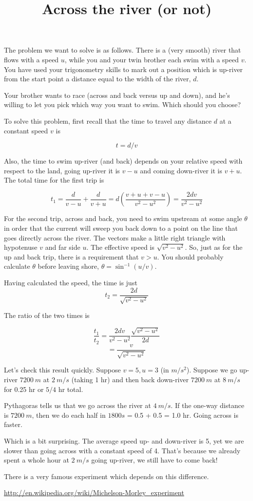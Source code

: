 \documentclass[11pt, oneside]{article}
\title{Across the river (or not)}
\date{}
\begin{document}
\maketitle
\Large


The problem we want to solve is as follows.  There is a (very smooth) river that flows with a speed $u$, while you and your twin brother each swim with a speed $v$.  You have used your trigonometry skills to mark out a position which is up-river from the start point a distance equal to the width of the river, $d$.

Your brother wants to race (across and back versus up and down), and he's willing to let you pick which way you want to swim.  Which should you choose?

To solve this problem, first recall that the time to travel any distance $d$ at a constant speed $v$ is 

\[ t = d/v \]

Also, the time to swim up-river (and back) depends on your relative speed with respect to the land, going up-river it is $v-u$ and coming down-river it is $v+u$.  The total time for the first trip is

\[ t_1 = \frac{d}{v-u} + \frac{d}{v+u} = d(\frac{v + u + v - u}{v^2-u^2}) = \frac{2dv}{v^2-u^2}\]

For the second trip, across and back, you need to swim upstream at some angle $\theta$ in order that the current will sweep you back down to a point on the line that goes directly across the river.  The vectors make a little right triangle with hypotenuse $v$ and far side $u$.  The effective speed is $\sqrt{v^2 - u^2}$.  So, just as for the up and back trip, there is a requirement that $v > u$.  You should probably calculate $\theta$ before leaving shore, $\theta = \sin^{-1}(u/v)$.

Having calculated the speed, the time is just
\[ t_2 = \frac{2d}{\sqrt{v^2 - u^2}} \]

The ratio of the two times is

\[ \frac{t_1}{t_2} = \frac{2dv}{v^2-u^2} \frac{\sqrt{v^2 - u^2}}{2d} \]
\[ = \frac{v}{\sqrt{v^2 - u^2}} \]

Let's check this result quickly.  Suppose $v=5, u=3$ (in $m/s^2$).  Suppose we go up-river $7200 \ m$ at $2 \ m/s$ (taking 1 hr) and then back down-river $7200 \ m$ at $8 \ m/s$ for 0.25 hr or $5/4$ hr total.  

Pythagoras tells us that we go across the river at $4\  m/s$.  If the one-way distance is $7200 \ m$, then we do each half in $1800 s$ = 0.5 + 0.5 = 1.0 hr.  Going across is faster.

Which is a bit surprising.  The average speed up- and down-river is 5, yet we are slower than going across with a constant speed of 4.  That's because we already spent a whole hour at $2 \ m/s$ going up-river, we still have to come back!

There is a very famous experiment which depends on this difference.

\url{http://en.wikipedia.org/wiki/Michelson-Morley_experiment}
\end{document}
